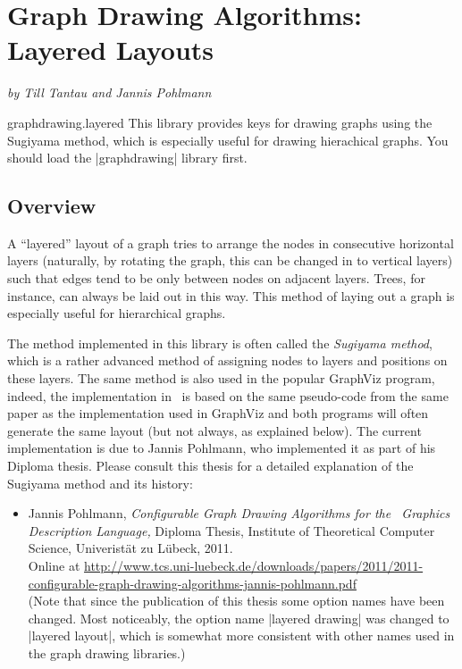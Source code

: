 %
%
%

\section{Graph Drawing Algorithms: Layered Layouts}

{\emph{by  Till Tantau and Jannis Pohlmann}}

\begin{tikzlibrary}{graphdrawing.layered}
  This library provides keys for drawing graphs using the Sugiyama
  method, which is especially useful for drawing hierachical graphs.
  You should load the |graphdrawing| library first.
\end{tikzlibrary}



\subsection{Overview}

A ``layered'' layout of a graph tries to arrange the nodes in
consecutive horizontal layers (naturally, by rotating the graph, this
can be changed in to vertical layers) such that edges tend to be only
between nodes on adjacent layers. Trees, for instance, can always be
laid out in this way. This method of laying out a graph is especially
useful for hierarchical graphs.

The method implemented in this library is often called the
\emph{Sugiyama method}, which is a rather advanced method of
assigning nodes to layers and positions on these layers. The same
method is also used in the popular GraphViz program, indeed, the
implementation in \tikzname\ is based on the same pseudo-code from the
same paper as the implementation used in GraphViz and both programs
will often generate the same layout (but not always, as explained
below). The current implementation is due to Jannis Pohlmann, who
implemented it as part of his Diploma thesis. Please consult this
thesis for a detailed explanation of the Sugiyama method and its
history:

\begin{itemize}
\item
  Jannis Pohlmann,
  \newblock \emph{Configurable Graph Drawing Algorithms
    for the \tikzname\ Graphics Description Language,}
  \newblock Diploma Thesis,
  \newblock Institute of Theoretical Computer Science, Univerist\"at
  zu L\"ubeck, 2011.\\[.5em]
  \newblock Online at 
  \url{http://www.tcs.uni-luebeck.de/downloads/papers/2011/2011-configurable-graph-drawing-algorithms-jannis-pohlmann.pdf}
  \\[.5em]
  (Note that since the publication of this thesis some option names
  have been changed. Most noticeably, the option name
  |layered drawing| was changed to |layered layout|, which is somewhat
  more consistent with other names used in the graph drawing
  libraries.) 
\end{itemize}

